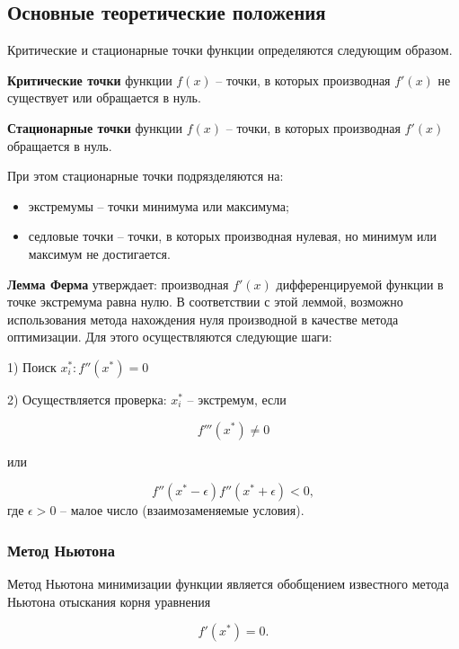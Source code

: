 \documentclass[a4paper,12pt]{article}
\begin{document}
\subsection*{Основные теоретические положения}

Критические и стационарные точки функции определяются следующим образом.

\textbf{Критические точки} функции $f(x)$ -- точки, в которых производная $f'(x)$ не существует или обращается в нуль.

\textbf{Стационарные точки} функции $f(x)$ -- точки, в которых производная $f'(x)$ обращается в нуль.

При этом стационарные точки подрязделяются на:

\begin{itemize}
	\item экстремумы -- точки минимума или максимума;
	\item седловые точки -- точки, в которых производная нулевая, но минимум или максимум не достигается.
\end{itemize}


\textbf{Лемма Ферма} утверждает: производная $f'(x)$ дифференцируемой функции в точке экстремума равна нулю.
В соответствии с этой леммой, возможно использования метода нахождения нуля производной в качестве метода оптимизации. Для этого осуществляются следующие шаги:

1) Поиск ${x_i^*}: f''(x^*) = 0$

2) Осуществляется проверка: $x_i^*$ -- экстремум, если  

\begin{equation}
f'''(x^*) \neq 0
\label{lf1}
\end{equation}

 или 
 
 \begin{equation}
  f''(x^* - \epsilon)f''(x^* + \epsilon) < 0, 
  \label{lf2}
 \end{equation}
где $\epsilon > 0$ -- малое число (взаимозаменяемые условия).

\subsubsection*{Метод Ньютона}
Метод Ньютона минимизации функции является обобщением известного метода Ньютона отыскания корня уравнения 

\begin{equation*}
f'(x^*) = 0.
\end{equation*}
\end{document}
